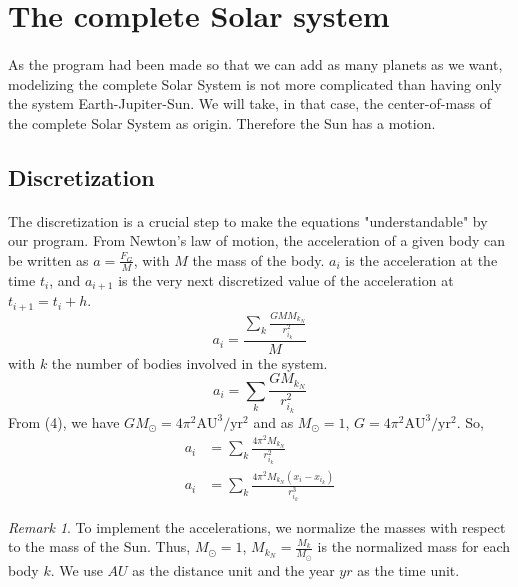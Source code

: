 \documentclass[a4paper, twoside, 11pt]{report}
\theoremstyle{theorem}
\theoremstyle{remark}
\newtheorem{remark}{Remark}[chapter]
\theoremstyle{exemple}
\begin{document}
    \section{The complete Solar system}
        \paragraph{}As the program had been made so that we can add as many planets as we want, modelizing the complete Solar System is not more complicated than having only the system Earth-Jupiter-Sun. We will take, in that case, the center-of-mass of the complete Solar System as origin. Therefore the Sun has a motion.
        

    \subsection{Discretization}
    
    \paragraph{}The discretization is a crucial step to make the equations "understandable" by our program. From Newton's law of motion, the acceleration of a given body can be written as $a=\frac{F_G}{M}$, with $M$ the mass of the body. $a_i$ is the acceleration at the time $t_i$, and ${a}_{i+1}$ is the very next discretized value of the acceleration at ${t}_{i+1}={t}_{i}+h$.
                \begin{equation*}
                    a_i = \frac{ \sum\limits_{k} \frac{GMM_{k_N}}{r_{i_k}^2}}{M}
                \end{equation*}
            with $k$ the number of bodies involved in the system. 
                \begin{equation*}
                    a_i = \sum\limits_{k} \frac{GM_{k_N}}{r_{i_k}^2}
                \end{equation*}
            From (4), we have $GM_{\odot} = 4\pi^2\mathrm{AU}^3/\mathrm{yr}^2$ and as $M_{\odot}=1$, $G=4\pi^2\mathrm{AU}^3/\mathrm{yr}^2$. So,
                \begin{align*}
                    a_i &= \sum\limits_{k} \frac{4\pi^2M_{k_N}}{r_{i_k}^2} \\
                    a_i &= \sum\limits_{k} \frac{4\pi^2M_{k_N}(x_i-x_{i_k})}{r_{i_k}^3} 
                    \tag{7}
                 \end{align*}
                 
                     \begin{remark}
    	To implement the accelerations, we normalize the masses with respect to the mass of the Sun. Thus, $M_{\odot}=1$, $M_{k_N}=\frac{M_k}{M_{\odot}}$ is the normalized mass for each body $k$. We use $AU$ as the distance unit and the year $yr$ as the time unit.
	\end{remark}
\end{document}
